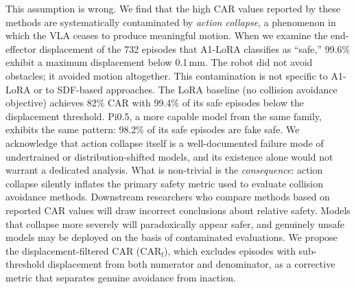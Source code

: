 This assumption is wrong. We find that the high CAR values reported by these methods are systematically contaminated by \emph{action collapse}, a phenomenon in which the VLA ceases to produce meaningful motion. When we examine the end-effector displacement of the 732 episodes that A1-LoRA classifies as ``safe,'' 99.6\% exhibit a maximum displacement below 0.1\,mm. The robot did not avoid obstacles; it avoided motion altogether. This contamination is not specific to A1-LoRA or to SDF-based approaches. The LoRA baseline (no collision avoidance objective) achieves 82\% CAR with 99.4\% of its safe episodes below the displacement threshold. Pi0.5, a more capable model from the same family, exhibits the same pattern: 98.2\% of its safe episodes are fake safe. We acknowledge that action collapse itself is a well-documented failure mode of undertrained or distribution-shifted models, and its existence alone would not warrant a dedicated analysis. What is non-trivial is the \emph{consequence}: action collapse silently inflates the primary safety metric used to evaluate collision avoidance methods. Downstream researchers who compare methods based on reported CAR values will draw incorrect conclusions about relative safety. Models that collapse more severely will paradoxically appear safer, and genuinely unsafe models may be deployed on the basis of contaminated evaluations. We propose the displacement-filtered CAR (CAR$_\text{f}$), which excludes episodes with sub-threshold displacement from both numerator and denominator, as a corrective metric that separates genuine avoidance from inaction.

